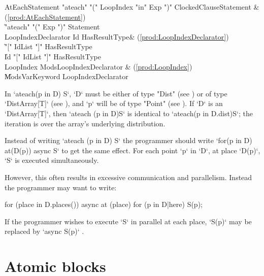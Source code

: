 \begin{bbgrammar}
     AtEachStatement \: \xcd"ateach" \xcd"(" LoopIndex \xcd"in" Exp \xcd")" ClockedClause\opt Statement & (\ref{prod:AtEachStatement}) \\
                    \| \xcd"ateach" \xcd"(" Exp \xcd")" Statement \\
 LoopIndexDeclarator \: Id HasResultType\opt & (\ref{prod:LoopIndexDeclarator}) \\
                    \| \xcd"[" IdList \xcd"]" HasResultType\opt \\
                    \| Id \xcd"[" IdList \xcd"]" HasResultType\opt \\
           LoopIndex \: Mods\opt LoopIndexDeclarator & (\ref{prod:LoopIndex}) \\
                    \| Mods\opt VarKeyword LoopIndexDeclarator \\
\end{bbgrammar}
In \xcd`ateach(p in D) S`, \xcd`D` must be either of type \xcd"Dist"
(see ) or of type \xcd`DistArray[T]` (see
), and \xcd`p` will be of type \xcd"Point" (see
). If \xcd`D` is an \xcd`DistArray[T]`, then
\xcd`ateach (p in D)S` is identical to 
\xcd`ateach(p in D.dist)S`; the iteration is over the array's underlying
distribution.   

Instead of writing \xcd`ateach (p in D) S` the programmer should write 
\xcd`for(p in D) at(D(p)) async S` to get the same effect. 
For each point \xcd`p` in \xcd`D`, at place \xcd`D(p)`, \xcd`S` is
executed simultaneously.

However, this often results in excessive communication and parallelism. Instead the
programmer may want to write: 
\begin{xten}
for (place in D.places()) async at (place) {
    for (p in D|here) {
        S(p);
    }
}
\end{xten}

If the programmer wishes to execute \xcd`S` in parallel at each place,
\xcd`S(p)` may be replaced by 
\xcd`async S(p)`
.




\section{Atomic blocks}\label{AtomicBlocks}

